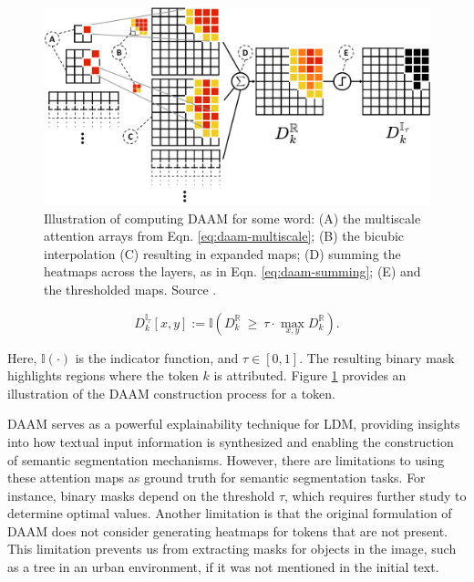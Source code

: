 \begin{figure}
    \centering
    \includegraphics[width=1\columnwidth]{img/3-methodology/daam-diagram.pdf}
    \caption[Illustration of computing DAAM for some
word]{Illustration of computing DAAM for some
word: (A) the multiscale attention arrays from Eqn. \ref{eq:daam-multiscale}; (B) the bicubic interpolation  (C) resulting in expanded
maps; (D) summing the heatmaps across the layers,
as in Eqn. \ref{eq:daam-summing}; (E) and the thresholded maps. Source \cite{DAAM}.}
    \label{fig:daam}
\end{figure}


\begin{equation}
\label{eq:daam-binary}
    D_k^{\mathbb{I}_\tau}[x, y] := \mathbb{I}\left ( D_k^{\mathbb{R}}~\ge~\tau\cdot\max_{x, y}D_k^{\mathbb{R}} \right ).
\end{equation}

Here, $\mathbb{I}(\cdot)$ is the indicator function, and $\tau \in \left[0, 1 \right]$. The resulting binary mask highlights regions where the token $k$ is attributed. Figure \ref{fig:daam} provides an illustration of the DAAM construction process for a token.

DAAM serves as a powerful explainability technique for LDM, providing insights into how textual input information is synthesized and enabling the construction of semantic segmentation mechanisms. However, there are limitations to using these attention maps as ground truth for semantic segmentation tasks. For instance, binary masks depend on the threshold $\tau$, which requires further study to determine optimal values. Another limitation is that the original formulation of DAAM \cite{DAAM} does not consider generating heatmaps for tokens that are not present. This limitation prevents us from extracting masks for objects in the image, such as a tree in an urban environment, if it was not mentioned in the initial text.

